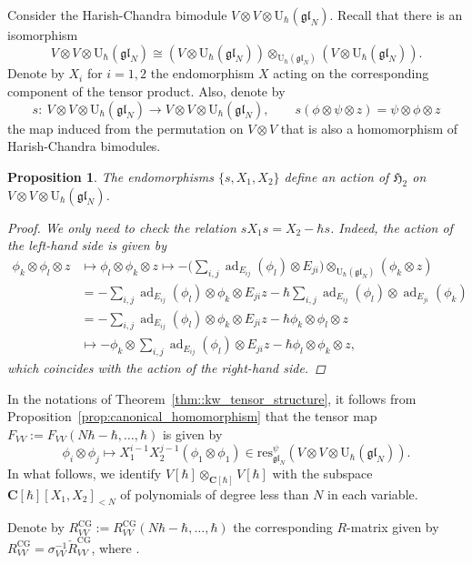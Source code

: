 \documentclass[pdftex]{sigma}
\numberwithin{equation}{section}
\newtheorem{Proposition}[Theorem]{Proposition}
{ \theoremstyle{definition}
	\newtheorem{Definition}[Theorem]{Definition}
	\newtheorem{Note}[Theorem]{Note}
	\newtheorem{Example}[Theorem]{Example}
	\newtheorem{Remark}[Theorem]{Remark} }
\newcommand{\CG}{\mathrm{CG}}
\newcommand{\C}{\mathbf{C}}
\newcommand{\U}{\mathrm{U}_{\hbar}}
\DeclareMathOperator{\ad}{ad}
\newcommand{\res}{\mathrm{res}}
\newcommand{\gl}{\mathfrak{gl}}
\begin{document}
	Consider the Harish-Chandra bimodule $V \otimes V \otimes \U(\gl_N)$. Recall that there is an isomorphism
	\[
	V \otimes V \otimes \U(\gl_N) \cong (V \otimes \U(\gl_N)) \otimes_{\U(\gl_N)} (V \otimes \U(\gl_N)).
	\]
	Denote by $X_i$ for $i=1,2$ the endomorphism $X$ acting on the corresponding component of the tensor product. Also, denote by
	\[
	s \colon\ V \otimes V \otimes \U(\gl_N) \rightarrow V \otimes V \otimes \U(\gl_N), \qquad s(\phi \otimes \psi \otimes z) = \psi \otimes \phi \otimes z
	\]
	the map induced from the permutation on $V \otimes V$ that is also a homomorphism of Harish-Chandra bimodules.
	
	\begin{Proposition}
		The endomorphisms $\{s,X_1,X_2\}$ define an action of $\mathfrak{H}_2$ on $V \otimes V \otimes \U(\gl_N)$.
		\begin{proof}
			We only need to check the relation $s X_1 s = X_2 - \hbar s$. Indeed, the action of the left-hand side is given by
			\begin{align*}
				\phi_k \otimes \phi_l \otimes z &\mapsto \phi_l \otimes \phi_k \otimes z \mapsto -\bigg(\sum_{i,j} \ad_{E_{ij}}(\phi_l) \otimes E_{ji}\bigg) \otimes_{\U(\gl_N)} (\phi_k \otimes z) \\
				& = -\sum_{i,j} \ad_{E_{ij}}(\phi_l) \otimes \phi_k \otimes E_{ji}z - \hbar \sum_{i,j} \ad_{E_{ij}} (\phi_l) \otimes \ad_{E_{ji}} (\phi_k) \\
				&= -\sum_{i,j} \ad_{E_{ij}}(\phi_l) \otimes \phi_k \otimes E_{ji}z - \hbar \phi_k \otimes \phi_l \otimes z \\
				&\mapsto - \phi_k\otimes \sum_{i,j} \ad_{E_{ij}}(\phi_l) \otimes E_{ji}z - \hbar \phi_l \otimes \phi_k \otimes z,
			\end{align*}
			which coincides with the action of the right-hand side.
		\end{proof}
	\end{Proposition}
	
	In the notations of Theorem~\ref{thm::kw_tensor_structure}, it follows from Proposition~\ref{prop:canonical_homomorphism} that the tensor map $F_{VV}:=F_{VV}(N\hbar-\hbar,\dots,\hbar)$ is given by
	\[
	\phi_i \otimes \phi_j \mapsto X_1^{i-1} X_2^{j-1}(\phi_1 \otimes \phi_1)\in \res^{\psi}_{\gl_N}(V \otimes V \otimes \U(\gl_N)).
	\]
	In what follows, we identify $V[\hbar] \otimes_{\C[\hbar]} V[\hbar]$ with the subspace $\C[\hbar][X_1,X_2]_{<N}$ of polynomials of degree less than $N$ in each variable.
	
	Denote by $R^{\CG}_{VV}:= R^{\CG}_{VV}(N\hbar-\hbar,\dots,\hbar)$ the corresponding $R$-matrix given by $R^{\CG}_{VV}\! =\! \sigma_{VV}^{-1} \check{R}^{\CG}_{VV}$, where \smash{$\check{R}^{\CG}_{VV} = F_{VV}^{-1} \sigma_{VV} F_{VV}$}.
	
\end{document}
